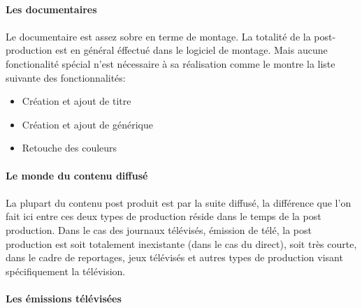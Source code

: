 \paragraph {Les documentaires}

\paragraph{}

Le documentaire est assez sobre en terme de montage. La totalité de
la post-production est en général éffectué dans le logiciel de montage.
Mais aucune fonctionalité spécial n'est nécessaire à sa réalisation comme
le montre la liste suivante des fonctionnalités:

\begin{itemize} \setlength{\itemsep}{2mm}

  \item{Création et ajout de titre}

  \item{Création et ajout de générique}

  \item{Retouche des couleurs}

\end{itemize}

\newpage\paragraph{Le monde du contenu diffusé}

\paragraph{}

La plupart du contenu post produit est par la suite diffusé, la
différence que l'on fait ici entre ces deux types de production
réside dans le temps de la post production.  Dans le cas des journaux
télévisés, émission de télé, la post production est soit totalement
inexistante (dans le cas du direct), soit très courte, dans le cadre
de reportages, jeux télévisés et autres types de production visant
spécifiquement la télévision.

\paragraph {Les émissions télévisées}

\paragraph{}

